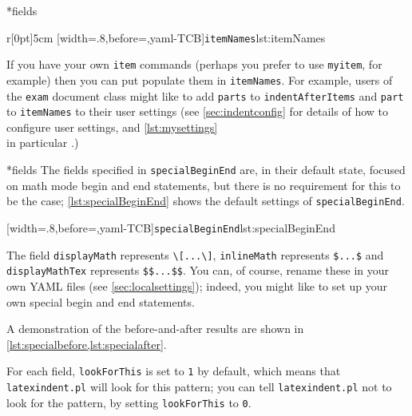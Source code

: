 *{fields}
	\begin{wrapfigure}[5]{r}[0pt]{5cm}
		[width=.8\linewidth,before=\centering,yaml-TCB]{\texttt{itemNames}}{lst:itemNames}
	\end{wrapfigure}
	If you have your own \texttt{item} commands (perhaps you
	prefer to use \texttt{myitem}, for example)
	then you can put populate them in \texttt{itemNames}.
	For example, users of the \texttt{exam} document class might like to add
	\texttt{parts} to \texttt{indentAfterItems} and \texttt{part} to \texttt{itemNames}
	to their user settings (see \vref{sec:indentconfig} for details of how to configure user settings,
	and \vref{lst:mysettings} \\ in particular \label{page:examsettings}.)

*{fields}\label{yaml:specialBeginEnd}
	The fields specified in \texttt{specialBeginEnd} are, in their default state, focused on math mode begin and end statements, but
	there is no requirement for this to be the case; \cref{lst:specialBeginEnd} shows the
	default settings of \texttt{specialBeginEnd}.

	[width=.8\linewidth,before=\centering,yaml-TCB]{\texttt{specialBeginEnd}}{lst:specialBeginEnd}

	The field \texttt{displayMath} represents \lstinline!\[...\]!, \texttt{inlineMath} represents
	\lstinline!$...$! and \texttt{displayMathTex} represents \lstinline!$$...$$!. You can, of course,
	rename these in your own YAML files (see \vref{sec:localsettings}); indeed, you
	might like to set up your own special begin and end statements.

	A demonstration of the before-and-after results are shown in \cref{lst:specialbefore,lst:specialafter}.

	\begin{minipage}{.45\textwidth}
	\end{minipage}%
	\hfill
	\begin{minipage}{.45\textwidth}
	\end{minipage}

	For each field, \texttt{lookForThis} is set to \texttt{1} by default, which means that \texttt{latexindent.pl}
	will look for this pattern; you can tell \texttt{latexindent.pl} not to look for the pattern, by setting
	\texttt{lookForThis} to \texttt{0}.

